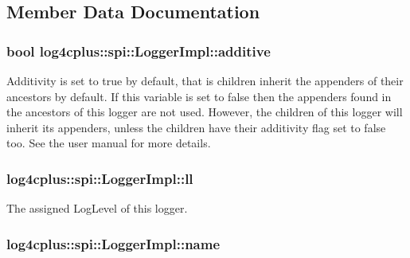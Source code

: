 \subsection{Member Data Documentation}
\hypertarget{classlog4cplus_1_1spi_1_1LoggerImpl_ae41a18de17a3693b52fd4e37234a5045}{
\subsubsection[{additive}]{\setlength{\rightskip}{0pt plus 5cm}bool log4cplus\-::spi\-::\-Logger\-Impl\-::additive\hspace{0.3cm}{\ttfamily [protected]}}}\label{classlog4cplus_1_1spi_1_1LoggerImpl_ae41a18de17a3693b52fd4e37234a5045}
Additivity is set to true by default, that is children inherit the appenders of their ancestors by default. If this variable is set to {\ttfamily false} then the appenders found in the ancestors of this logger are not used. However, the children of this logger will inherit its appenders, unless the children have their additivity flag set to {\ttfamily false} too. See the user manual for more details. \hypertarget{classlog4cplus_1_1spi_1_1LoggerImpl_a8a3672445f1145629a59e27655c480c4}{
\subsubsection[{ll}]{ log4cplus\-::spi\-::\-Logger\-Impl\-::ll\hspace{0.3cm}{\ttfamily [protected]}}}\label{classlog4cplus_1_1spi_1_1LoggerImpl_a8a3672445f1145629a59e27655c480c4}
The assigned Log\-Level of this logger. \hypertarget{classlog4cplus_1_1spi_1_1LoggerImpl_af746144fa2121b3bb6567c71e15a3d8d}{
\subsubsection[{name}]{ log4cplus\-::spi\-::\-Logger\-Impl\-::name\hspace{0.3cm}{\ttfamily [protected]}}}\label{classlog4cplus_1_1spi_1_1LoggerImpl_af746144fa2121b3bb6567c71e15a3d8d}
